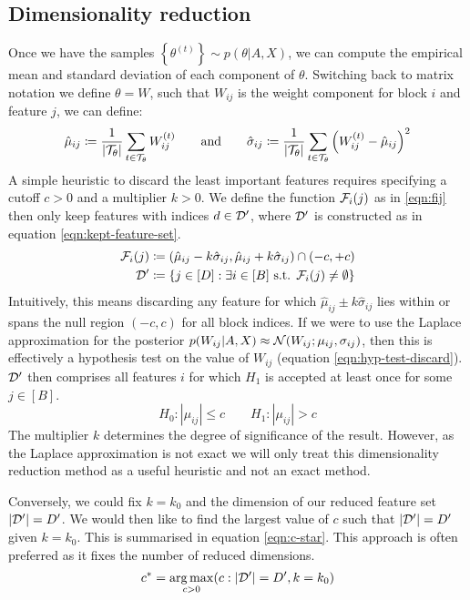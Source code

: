\subsection{Dimensionality reduction}
\label{sec:dim-reduction}

Once we have the samples $\left\{ \theta^{(t)} \right\} \sim p(\theta | A, X)$, we can compute the empirical mean and standard deviation of each component of $\theta$. Switching back to matrix notation we define $\theta = W$, such that $W_{ij}$ is the weight component for block $i$ and feature $j$, we can define:
%
\begin{equation}
	\hat{\mu}_{ij} \coloneqq \frac{1}{|\mathcal{T}_\theta|} \sum_{t \in \mathcal{T}_\theta} W_{ij}^{(t)} \qquad \textrm{and} \qquad
	\hat{\sigma}_{ij} \coloneqq \frac{1}{|\mathcal{T}_\theta|} \sum_{t \in \mathcal{T}_\theta} \left( W_{ij}^{(t)} - \hat{\mu}_{ij} \right)^2
\end{equation}
%
A simple heuristic to discard the least important features requires specifying a cutoff $c > 0$ and a multiplier $k > 0$. We define the function $\mathcal{F}_i(j)$ as in \ref{eqn:fij} then only keep features with indices $d \in \mathcal{D}'$, where $\mathcal{D}'$ is constructed as in equation \ref{eqn:kept-feature-set}.
%
\begin{align}
	\mathcal{F}_i(j) &\coloneqq (\hat{\mu}_{ij} - k \hat{\sigma}_{ij}, \hat{\mu}_{ij} + k \hat{\sigma}_{ij}) \cap (-c, +c)
	\label{eqn:fij} \\
	\mathcal{D}' &\coloneqq \left\{ j \in [D] : \exists i \in [B] \textrm{ s.t. }  \mathcal{F}_i(j) \neq \emptyset \right\}
	\label{eqn:kept-feature-set}
\end{align}
%
Intuitively, this means discarding any feature for which $\hat{\mu}_{ij} \pm k\hat{\sigma}_{ij}$ lies within or spans the null region $(-c, c)$ for all block indices. If we were to use the Laplace approximation for the posterior $p(W_{ij} | A, X) \approx \mathcal{N}(W_{ij}; \mu_{ij}, \sigma_{ij})$, then this is effectively a hypothesis test on the value of $W_{ij}$ (equation \ref{eqn:hyp-test-discard}). $\mathcal{D}'$ then comprises all features $i$ for which $H_1$ is accepted at least once for some $j \in [B]$.
%
\begin{equation}
	H_0: |\mu_{ij}| \leq c \qquad
	H_1: |\mu_{ij}| > c
	\label{eqn:hyp-test-discard}
\end{equation}
%
The multiplier $k$ determines the degree of significance of the result. However, as the Laplace approximation is not exact we will only treat this dimensionality reduction method as a useful heuristic and not an exact method.

Conversely, we could fix $k=k_0$ and the dimension of our reduced feature set $|\mathcal{D}'|=D'$. We would then like to find the largest value of $c$ such that $|\mathcal{D}'|=D'$ given $k=k_0$. This is summarised in equation \ref{eqn:c-star}. This approach is often preferred as it fixes the number of reduced dimensions.
%
\begin{equation}
	c^* = \operatorname*{arg\,max}_{c>0} (c : |\mathcal{D}'| = D', k=k_0)
	\label{eqn:c-star}
\end{equation}
%